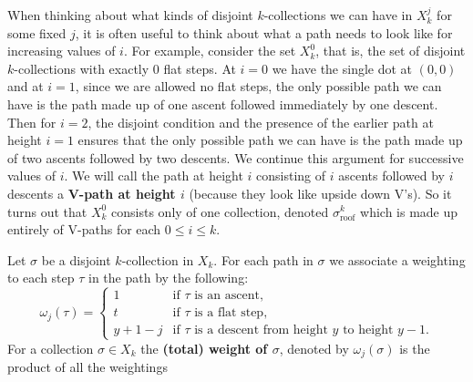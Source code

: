 \documentclass[11pt]{article}
\theoremstyle{definition}
\theoremstyle{definition}
\theoremstyle{plain}
\theoremstyle{plain}
\theoremstyle{plain}
\theoremstyle{definition}
\begin{document}
When thinking about what kinds of disjoint $k$-collections we can have in $X_k^j$ for some fixed $j$, it is often useful to think about what a path needs to look like for increasing values of $i$. For example, consider the set $X_k^0$, that is, the set of disjoint $k$-collections with exactly 0 flat steps. At $i = 0$ we have the single dot at $(0,0)$ and at $i = 1$, since we are allowed no flat steps, the only possible path we can have is the path made up of one ascent followed immediately by one descent. Then for $i = 2$, the disjoint condition and the presence of the earlier path at height $i=1$ ensures that the only possible path we can have is the path made up of two ascents followed by two descents. We continue this argument for successive values of $i$. We will call the path at height $i$ consisting of $i$ ascents followed by $i$ descents a \textbf{V-path at height $i$} (because they look like upside down V's). So it turns out that $X_k^0$ consists only of one collection, denoted $\sigma_{\text{roof}}^k$ which is made up entirely of V-paths for each $0\leq i\leq k$.

Let $\sigma$ be a disjoint $k$-collection in $X_k$. For each path in $\sigma$ we associate a weighting to each step $\tau$ in the path by the following:
\begin{equation*}
\omega_j(\tau) = \begin{cases} 
1 &\text{if $\tau$ is an ascent,} \\
t &\text{if $\tau$ is a flat step,} \\
y+1-j &\text{if $\tau$ is a descent from height $y$ to height $y-1$.}
\end{cases}
\end{equation*}
For a collection $\sigma\in X_k$ the \textbf{(total) weight of $\sigma$}, denoted by $\omega_j(\sigma)$ is the product of all the weightings
\end{document}
